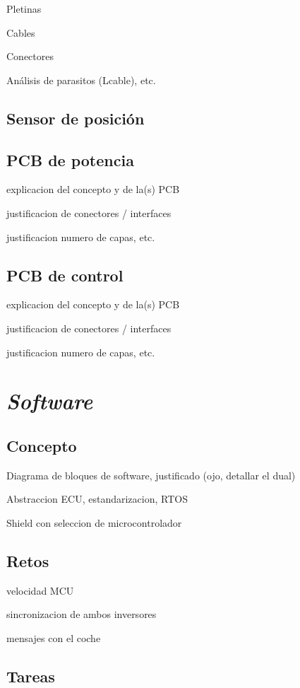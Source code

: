 Pletinas

Cables

Conectores

Análisis de parasitos (Lcable), etc.

\subsection{Sensor de posición}

\subsection{PCB de potencia}

explicacion del concepto y de la(s) PCB

justificacion de conectores / interfaces

justificacion numero de capas, etc.

\subsection{PCB de control}

explicacion del concepto y de la(s) PCB

justificacion de conectores / interfaces

justificacion numero de capas, etc.


\section{\textit{Software}}

\subsection{Concepto}

Diagrama de bloques de software, justificado (ojo, detallar el dual)

Abstraccion ECU, estandarizacion, RTOS

Shield con seleccion de microcontrolador


\subsection{Retos}

velocidad MCU

sincronizacion de ambos inversores

mensajes con el coche

\subsection{Tareas}

